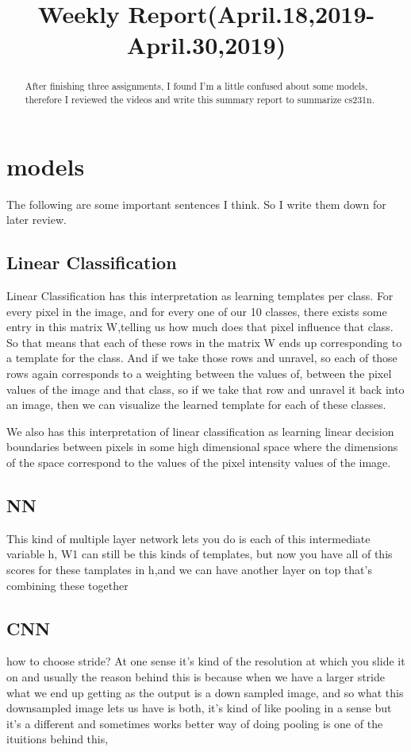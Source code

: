 \documentclass{article}
\title{Weekly Report(April.18,2019-April.30,2019)}
\begin{document}
	\maketitle
	\begin{abstract}
		After finishing three assignments, I found I'm a little confused about some models, therefore I reviewed the videos and write this summary report to summarize cs231n.
	\end{abstract}
\section{models}
The following are some important sentences I think. So I write them down for later review.

\subsection{Linear Classification}
Linear Classification has this interpretation as learning templates per class. For every pixel in the image, and for every one of our 10 classes, there exists some entry in this matrix W,telling us how much does that pixel influence that class. So that means that each of these rows in the matrix W ends up corresponding to a template for the class. And if we take those rows and unravel, so each of those rows again corresponds to a weighting between the values of, between the pixel values of the image and that class, so if we take that row and unravel it back into an image, then we can visualize the learned template for each of these classes.

We also has this interpretation of linear classification as learning linear decision boundaries between pixels in some high dimensional space where the dimensions of the space correspond to the values of the pixel intensity values of the image.

\subsection{NN}
This kind of multiple layer network lets you do is each of this intermediate variable h, W1 can still be this kinds of templates, but now you have all of this scores for these tamplates in h,and we can have another layer on top that's combining these together
\subsection{CNN}
how to choose stride?
At one sense it's kind of the resolution at which you slide it on and usually the reason behind this is because when we have a larger stride what we end up getting as the output is a down sampled image, and so what this downsampled image lets us have is both, it's kind of like pooling in a sense but it's a different and sometimes works better way of doing pooling is one of the ituitions behind this,	
\end{document}
